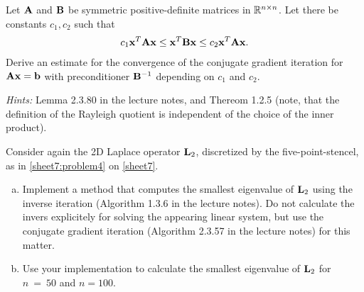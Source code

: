 
\begin{Sheet}
  \label{sheet11}

  \begin{Problem}
    Let $\mathbf A$ and $\mathbf B$ be symmetric positive-definite matrices in
    $\mathbb R^{n\times n}$. Let there be constants $c_1,c_2$ such that
    \begin{gather*}
      c_1 \mathbf x^T\mathbf A\mathbf x \leq \mathbf x^T\mathbf B\mathbf x \leq c_2 \mathbf x^T\mathbf A\mathbf x.
    \end{gather*}
    Derive an estimate for the convergence of the conjugate gradient
    iteration for $\mathbf A\mathbf x=\mathbf b$ with preconditioner $\mathbf B^{-1}$
    depending on $c_1$ and $c_2$.

    \textit{Hints:} Lemma 2.3.80 in the lecture notes, and Thereom
    1.2.5 (note, that the definition of the Rayleigh quotient is
    independent of the choice of the inner product).
  \end{Problem}

  \begin{Problem}
    Consider again the 2D Laplace operator $\mathbf L_2$, discretized by
    the five-point-stencel, as in \cref{sheet7:problem4} on
    \cref{sheet7}.
    \begin{enumerate}[(a)]
    \item Implement a method that computes the smallest eigenvalue of
      $\mathbf L_2$ using the inverse iteration (Algorithm 1.3.6 in the
      lecture notes).  Do not calculate the invers explicitely for
      solving the appearing linear system, but use the conjugate
      gradient iteration (Algorithm 2.3.57 in the lecture notes) for
      this matter.
    \item Use your implementation to calculate the smallest eigenvalue
      of $\mathbf L_2$ for $n~=~50$ and $n=100$.
    \end{enumerate}
  \end{Problem}

\end{Sheet}


